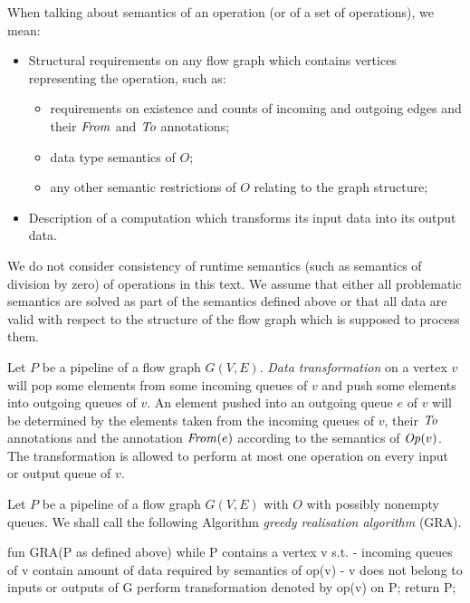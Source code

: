   When talking about semantics of an operation (or of a set of operations), we mean:
  \begin{itemize}
    \item Structural requirements on any flow graph which contains vertices representing the operation, such as:
    \begin{itemize}
      \item requirements on existence and counts of incoming and outgoing edges and their $\mf{from}$ and $\mf{to}$ annotations;
      \item data type semantics of $O$;
      \item any other semantic restrictions of $O$ relating to the graph structure;
    \end{itemize}
    \item Description of a computation which transforms its input data into its output data.
  \end{itemize}
\myenddef

  We do not consider consistency of runtime semantics (such as semantics of division by zero) of operations in this text. We assume that either all problematic semantics are solved as part of the semantics defined above or that all data are valid with respect to the structure of the flow graph which is supposed to process them.


  Let $P$ be a pipeline of a flow graph $G(V,E)$. \emph{Data transformation} on a vertex $v$ will pop some elements from some incoming queues of $v$ and push some elements into outgoing queues of $v$. An element pushed into an outgoing queue $e$ of $v$ will be determined by the elements taken from the incoming queues of $v$, their $\mf{to}$ annotations and the annotation $\mf{from}(e)$ according to the semantics of $\mf{op}(v)$. The transformation is allowed to perform at most one operation on every input or output queue of $v$.
\myenddef


  Let $P$ be a pipeline of a flow graph $G(V,E)$ with $O$ with possibly nonempty queues. We shall call the following Algorithm \emph{greedy realisation algorithm} (GRA).
  \begin{code}
fun GRA(P as defined above)
{
  while P contains a vertex v s.t. 
    - incoming queues of v contain amount of data 
               required by semantics of op(v) 
    - v does not belong to inputs or outputs of G
  {
    perform transformation denoted by op(v) on P;
  }
  return P;  
}
  \end{code}
\myendalg


